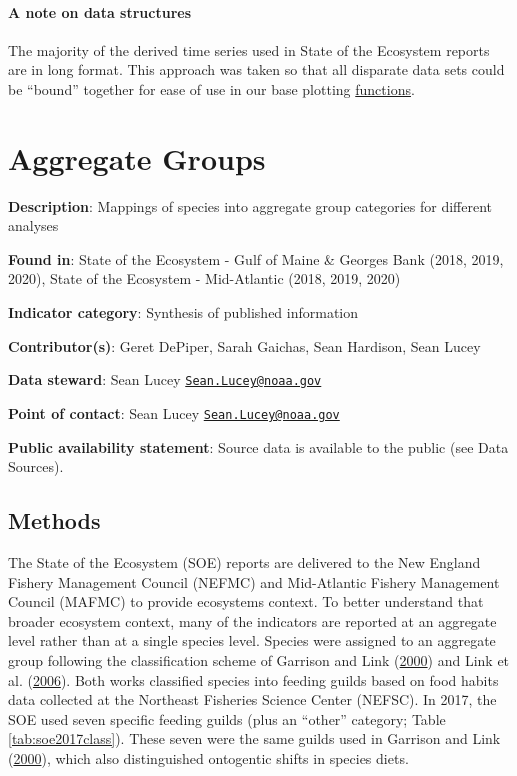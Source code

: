 \documentclass[
]{book}
\begin{document}
\hypertarget{a-note-on-data-structures}{%
\subsubsection{A note on data structures}\label{a-note-on-data-structures}}

The majority of the derived time series used in State of the Ecosystem reports are in long format. This approach was taken so that all disparate data sets could be ``bound'' together for ease of use in our base plotting \href{(https://github.com/NOAA-EDAB/tech-doc/blob/master/R/BasePlot_source.R)}{functions}.

\hypertarget{aggroups}{%
\chapter{Aggregate Groups}\label{aggroups}}

\textbf{Description}: Mappings of species into aggregate group categories for different analyses

\textbf{Found in}: State of the Ecosystem - Gulf of Maine \& Georges Bank (2018, 2019, 2020), State of the Ecosystem - Mid-Atlantic (2018, 2019, 2020)

\textbf{Indicator category}: Synthesis of published information

\textbf{Contributor(s)}: Geret DePiper, Sarah Gaichas, Sean Hardison, Sean Lucey

\textbf{Data steward}: Sean Lucey \href{mailto:Sean.Lucey@noaa.gov}{\nolinkurl{Sean.Lucey@noaa.gov}}

\textbf{Point of contact}: Sean Lucey \href{mailto:Sean.Lucey@noaa.gov}{\nolinkurl{Sean.Lucey@noaa.gov}}

\textbf{Public availability statement}: Source data is available to the public (see Data Sources).

\hypertarget{methods}{%
\section{Methods}\label{methods}}

The State of the Ecosystem (SOE) reports are delivered to the New England Fishery Management Council (NEFMC) and Mid-Atlantic Fishery Management Council (MAFMC) to provide ecosystems context. To better understand that broader ecosystem context, many of the indicators are reported at an aggregate level rather than at a single species level. Species were assigned to an aggregate group following the classification scheme of Garrison and Link (\protect\hyperlink{ref-garrison2000dietary}{2000}) and Link et al. (\protect\hyperlink{ref-link2006EMAX}{2006}). Both works classified species into feeding guilds based on food habits data collected at the Northeast Fisheries Science Center (NEFSC). In 2017, the SOE used seven specific feeding guilds (plus an ``other'' category; Table \ref{tab:soe2017class}). These seven were the same guilds used in Garrison and Link (\protect\hyperlink{ref-garrison2000dietary}{2000}), which also distinguished ontogentic shifts in species diets.
\end{document}
